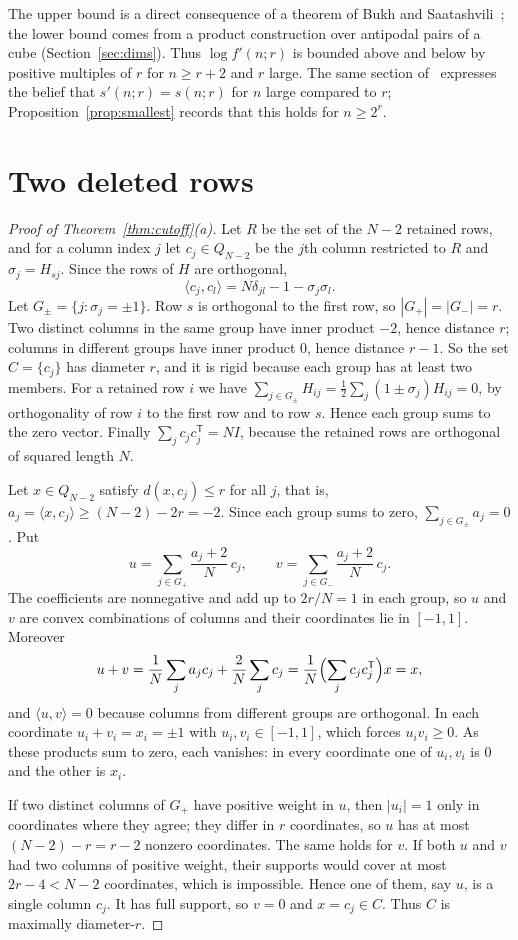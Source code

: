 \documentclass[11pt]{amsart}
\theoremstyle{remark}
\begin{document}
The upper bound is a direct consequence of a theorem of Bukh and Saatashvili~\cite{BS}; the lower bound comes from a
product construction over antipodal pairs of a cube (Section~\ref{sec:dims}). Thus $\log f'(n;r)$ is bounded above and
below by positive multiples of $r$ for $n\ge r+2$ and $r$ large. The same section of~\cite{BFW} expresses the belief that $s'(n;r)=s(n;r)$ for $n$ large compared to $r$;
Proposition~\ref{prop:smallest} records that this holds for $n\ge 2^r$.

\section{Two deleted rows}\label{sec:two}

\begin{proof}[Proof of Theorem~\ref{thm:cutoff}(a)]
Let $R$ be the set of the $N-2$ retained rows, and for a column index $j$ let $c_j\in Q_{N-2}$ be the $j$th column
restricted to $R$ and $\sigma_j=H_{sj}$. Since the rows of $H$ are orthogonal,
\[
\langle c_j,c_l\rangle=N\delta_{jl}-1-\sigma_j\sigma_l .
\]
Let $G_\pm=\{j:\sigma_j=\pm1\}$. Row $s$ is orthogonal to the first row, so $|G_+|=|G_-|=r$. Two distinct columns in
the same group have inner product $-2$, hence distance $r$; columns in different groups have inner product $0$, hence
distance $r-1$. So the set $C=\{c_j\}$ has diameter $r$, and it is rigid because each group has at least two members.
For a retained row $i$ we have $\sum_{j\in G_\pm}H_{ij}=\tfrac12\sum_j(1\pm\sigma_j)H_{ij}=0$, by orthogonality of row
$i$ to the first row and to row $s$. Hence each group sums to the zero vector. Finally
$\sum_j c_jc_j^{\mathsf T}=NI$, because the retained rows are orthogonal of squared length $N$.

Let $x\in Q_{N-2}$ satisfy $d(x,c_j)\le r$ for all $j$, that is, $a_j=\langle x,c_j\rangle\ge(N-2)-2r=-2$. Since each
group sums to zero, $\sum_{j\in G_\pm}a_j=0$. Put
\[
u=\sum_{j\in G_+}\frac{a_j+2}{N}\,c_j,\qquad v=\sum_{j\in G_-}\frac{a_j+2}{N}\,c_j .
\]
The coefficients are nonnegative and add up to $2r/N=1$ in each group, so $u$ and $v$ are convex combinations of
columns and their coordinates lie in $[-1,1]$. Moreover
\[
u+v=\frac1N\sum_j a_jc_j+\frac2N\sum_jc_j=\frac1N\Bigl(\sum_jc_jc_j^{\mathsf T}\Bigr)x=x,
\]
and $\langle u,v\rangle=0$ because columns from different groups are orthogonal. In each coordinate $u_i+v_i=x_i=\pm1$
with $u_i,v_i\in[-1,1]$, which forces $u_iv_i\ge0$. As these products sum to zero, each vanishes: in every coordinate
one of $u_i,v_i$ is $0$ and the other is $x_i$.

If two distinct columns of $G_+$ have positive weight in $u$, then $|u_i|=1$ only in coordinates where they agree; they
differ in $r$ coordinates, so $u$ has at most $(N-2)-r=r-2$ nonzero coordinates. The same holds for $v$. If both $u$
and $v$ had two columns of positive weight, their supports would cover at most $2r-4<N-2$ coordinates, which is
impossible. Hence one of them, say $u$, is a single column $c_j$. It has full support, so $v=0$ and $x=c_j\in C$. Thus
$C$ is maximally diameter-$r$.
\end{proof}
\end{document}
